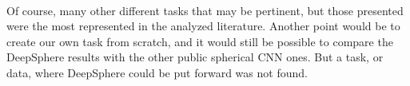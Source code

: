 \documentclass[11pt]{report}
\begin{document}
\paragraph*{}
Of course, many other different tasks that may be pertinent, but those presented were the most represented in the analyzed literature. Another point would be to create our own task from scratch, and it would still be possible to compare the DeepSphere results with the other public spherical CNN ones. But a task, or data, where DeepSphere could be put forward was not found.







\end{document}
